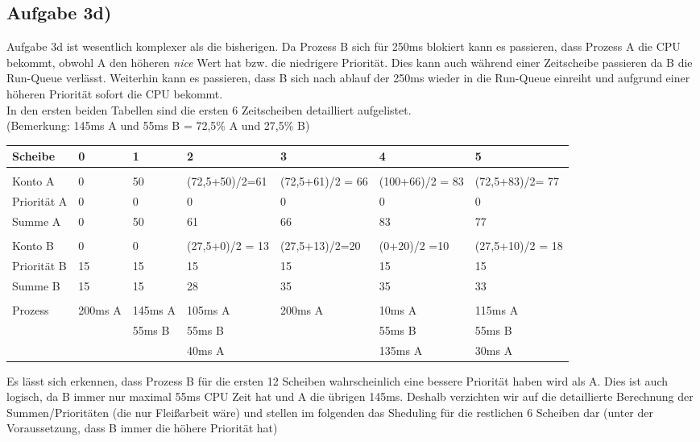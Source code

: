 \documentclass{ti2}
\begin{document}
\subsection*{Aufgabe 3d)}
Aufgabe 3d ist wesentlich komplexer als die bisherigen. Da Prozess B sich für 250ms blokiert kann es passieren, dass Prozess A die CPU bekommt, obwohl A den höheren \textit{nice} Wert hat bzw. die niedrigere Priorität. Dies kann auch während einer Zeitscheibe passieren da B die Run-Queue verlässt. Weiterhin kann es passieren, dass B sich nach ablauf der 250ms wieder in die Run-Queue einreiht und aufgrund einer höheren Priorität sofort die CPU bekommt. \\
 In den ersten beiden Tabellen sind die ersten 6 Zeitscheiben detailliert aufgelistet.\\
(Bemerkung: 145ms A und 55ms B = 72,5\% A und 27,5\% B) 
\begin{table}[htbp]
\begin{adjustbox}{max width=\textwidth}
\begin{tabular}{|l|l|l|l|l|l|l|}
\hline
Scheibe  & 0 & 1 & 2 & 3 & 4 & 5 \\ \hline
 &  &  &  &  &  &  \\ \hline
Konto A & 0 & 50 & (72,5+50)/2=61 & (72,5+61)/2 = 66 & (100+66)/2 = 83 & (72,5+83)/2= 77 \\ \hline
Priorität A & 0 & 0 & 0 & 0 & 0 & 0 \\ \hline
Summe A & 0 & 50 & 61 & 66 & 83 & 77 \\ \hline
 &  &  &  &  &  &  \\ \hline
Konto B & 0 & 0 & (27,5+0)/2 = 13 & (27,5+13)/2=20 & (0+20)/2 =10 & (27,5+10)/2 = 18 \\ \hline
Priorität B & 15 & 15 & 15 & 15 & 15 & 15 \\ \hline
Summe B & 15 & 15 & 28 & 35 & 35 & 33 \\ \hline
 &  &  &  &  &  &  \\ \hline
Prozess & 200ms A & 145ms A & 105ms A & 200ms A & 10ms A & 115ms A \\ \hline
 &  & 55ms B & 55ms B &  & 55ms B & 55ms B \\ \hline
 &  &  & 40ms A &  & 135ms A & 30ms A \\ \hline
\end{tabular}
\end{adjustbox}
\end{table}
Es lässt sich erkennen, dass Prozess B für die ersten 12 Scheiben wahrscheinlich eine bessere Priorität haben wird als A. Dies ist auch logisch, da B immer nur maximal 55ms CPU Zeit hat und A die übrigen 145ms. Deshalb verzichten wir auf die detaillierte Berechnung der Summen/Prioritäten (die nur Fleißarbeit wäre) und stellen im folgenden das Sheduling für die restlichen 6 Scheiben dar (unter der Voraussetzung, dass B immer die höhere Priorität hat) 
\end{document}
